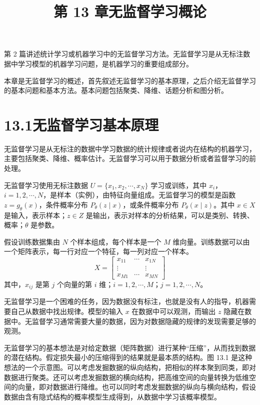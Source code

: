 \documentclass[UTF8,12pt,a4paper,fontset=fandol]{ctexart}
\title{第 13 章\quad 无监督学习概论}
\author{}
\date{}
\begin{document}
\maketitle

第 2 篇讲述统计学习或机器学习中的无监督学习方法。无监督学习是从无标注数据中学习模型的机器学习问题，是机器学习的重要组成部分。

本章是无监督学习的概述，首先叙述无监督学习的基本原理，之后介绍无监督学习的基本问题和基本方法。基本问题包括聚类、降维、话题分析和图分析。

\section*{13.1\quad 无监督学习基本原理}

无监督学习是从无标注的数据中学习数据的统计规律或者说内在结构的机器学习，主要包括聚类、降维、概率估计。无监督学习可以用于数据分析或者监督学习的前处理。

无监督学习使用无标注数据 $U=\{x_1,x_2,\cdots,x_N\}$ 学习或训练，其中 $x_i$，$i=1,2,\cdots,N$，是样本（实例），由特征向量组成。无监督学习的模型是函数 $z=g_\theta(x)$，条件概率分布 $P_\theta(z\mid x)$，或条件概率分布 $P_\theta(x\mid z)$。其中 $x\in X$ 是输入，表示样本；$z\in Z$ 是输出，表示对样本的分析结果，可以是类别、转换、概率；$\theta$ 是参数。

假设训练数据集由 $N$ 个样本组成，每个样本是一个 $M$ 维向量。训练数据可以由一个矩阵表示，每一行对应一个特征，每一列对应一个样本。
\[
X=
\begin{bmatrix}
x_{11} & \cdots & x_{1N}\\
\vdots & & \vdots\\
x_{M1} & \cdots & x_{MN}
\end{bmatrix}
\]
其中，$x_{ij}$ 是第 $j$ 个向量的第 $i$ 维；$i=1,2,\cdots,M$；$j=1,2,\cdots,N$。

无监督学习是一个困难的任务，因为数据没有标注，也就是没有人的指导，机器需要自己从数据中找出规律。模型的输入 $x$ 在数据中可以观测，而输出 $z$ 隐藏在数据中。无监督学习通常需要大量的数据，因为对数据隐藏的规律的发现需要足够的观测。

无监督学习的基本想法是对给定数据（矩阵数据）进行某种“压缩”，从而找到数据的潜在结构。假定损失最小的压缩得到的结果就是最本质的结构。图 13.1 是这种想法的一个示意图。可以考虑发掘数据的纵向结构，把相似的样本聚到同类，即对数据进行聚类。还可以考虑发掘数据的横向结构，把高维空间的向量转换为低维空间的向量，即对数据进行降维。也可以同时考虑发掘数据的纵向与横向结构，假设数据由含有隐式结构的概率模型生成得到，从数据中学习该概率模型。
\end{document}

